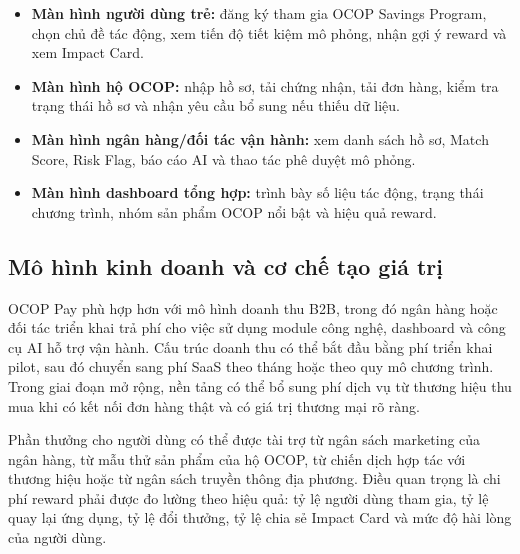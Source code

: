 \documentclass[13pt,a4paper]{extarticle}
\begin{document}
\begin{itemize}
    \item \textbf{Màn hình người dùng trẻ:} đăng ký tham gia OCOP Savings Program, chọn chủ đề tác động, xem tiến độ tiết kiệm mô phỏng, nhận gợi ý reward và xem Impact Card.
    \item \textbf{Màn hình hộ OCOP:} nhập hồ sơ, tải chứng nhận, tải đơn hàng, kiểm tra trạng thái hồ sơ và nhận yêu cầu bổ sung nếu thiếu dữ liệu.
    \item \textbf{Màn hình ngân hàng/đối tác vận hành:} xem danh sách hồ sơ, Match Score, Risk Flag, báo cáo AI và thao tác phê duyệt mô phỏng.
    \item \textbf{Màn hình dashboard tổng hợp:} trình bày số liệu tác động, trạng thái chương trình, nhóm sản phẩm OCOP nổi bật và hiệu quả reward.
\end{itemize}


\subsection{Mô hình kinh doanh và cơ chế tạo giá trị}

OCOP Pay phù hợp hơn với mô hình doanh thu B2B, trong đó ngân hàng hoặc đối tác triển khai trả phí cho việc sử dụng module công nghệ, dashboard và công cụ AI hỗ trợ vận hành. Cấu trúc doanh thu có thể bắt đầu bằng phí triển khai pilot, sau đó chuyển sang phí SaaS theo tháng hoặc theo quy mô chương trình. Trong giai đoạn mở rộng, nền tảng có thể bổ sung phí dịch vụ từ thương hiệu thu mua khi có kết nối đơn hàng thật và có giá trị thương mại rõ ràng.

Phần thưởng cho người dùng có thể được tài trợ từ ngân sách marketing của ngân hàng, từ mẫu thử sản phẩm của hộ OCOP, từ chiến dịch hợp tác với thương hiệu hoặc từ ngân sách truyền thông địa phương. Điều quan trọng là chi phí reward phải được đo lường theo hiệu quả: tỷ lệ người dùng tham gia, tỷ lệ quay lại ứng dụng, tỷ lệ đổi thưởng, tỷ lệ chia sẻ Impact Card và mức độ hài lòng của người dùng.
\end{document}
